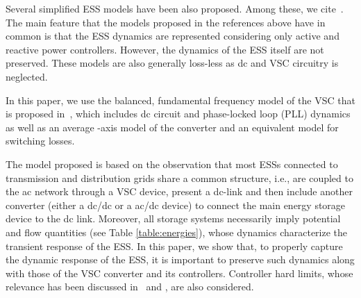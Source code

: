 \documentclass[journal, a4paper]{IEEEtran}
\begin{document}
Several simplified ESS models have been also proposed.  Among these, we
cite~\cite{pal:00, wu:12, sui:14, singh:13, fang:14}.  The main
feature that the models proposed in the references above have in
common is that the ESS dynamics are represented considering only
active and reactive power controllers.  However, the dynamics of the
ESS itself are not preserved.  These models are also generally
loss-less as dc and VSC circuitry is neglected.





In this paper, we use the balanced, fundamental frequency model of the
VSC that is proposed in~\cite{Chauduri:14, belmans:14, chauduri:11, Cole:2010, acha:13},
which includes dc circuit and phase-locked loop (PLL) dynamics as well as an 
average -axis model of the converter and an equivalent model for switching losses.

The model proposed is based on the observation that most ESSs
connected to transmission and distribution grids share a common
structure, i.e., are coupled to the ac network through a VSC device,
present a dc-link and then include another converter (either a dc/dc
or a ac/dc device) to connect the main energy storage device to the dc
link.  Moreover, all storage systems necessarily imply potential and
flow quantities (see Table \ref{table:energies}), whose dynamics
characterize the transient response of the ESS.  In this paper, we
show that, to properly capture the dynamic response of the ESS, it is
important to preserve such dynamics along with those of the VSC converter 
and its controllers.  Controller hard limits, whose relevance has been
discussed in~\cite{fang:14} and \cite{ortega:15}, are also considered.
\end{document}
